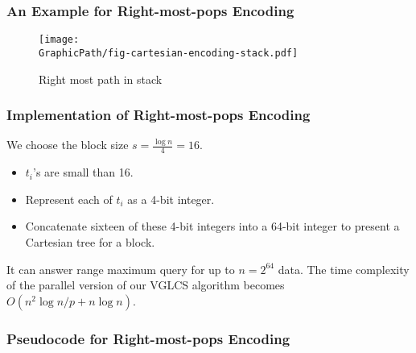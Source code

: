 \begin{frame}
	\frametitle{An Example for Right-most-pops Encoding}
	\begin{figure}[!thb]
	  \centering
	  \texttt{[image: \\GraphicPath/fig-cartesian-encoding-stack.pdf]}
	  \caption{Right most path in stack}
	  \label{fig:interval-cartesian}
	\end{figure}
\end{frame}

\begin{frame}
	\frametitle{Implementation of Right-most-pops Encoding}
	We choose the block size $s = {{\frac{\log n}{4}}} = 16$.

	\begin{itemize}	
		\setlength\itemsep{1em}
		\item
			$t_i$'s are small than 16.
		\item
			Represent each of $t_i$ as a 4-bit integer.
		\item
			Concatenate sixteen of these 4-bit integers into a 64-bit
			integer to present a Cartesian tree for a block.
	\end{itemize}
	\vspace{1cm}
	It can answer range maximum query for up to $n = 2^{64}$ data.  The
	time complexity of the parallel version of our VGLCS algorithm
	becomes $O(n^2 \log{n} / p + n \log n)$.
\end{frame}

\begin{frame}
	\frametitle{Pseudocode for Right-most-pops Encoding}
	\begin{center}
		\scalebox{1} { \begin{minipage}{1\textwidth}
			
			\end{minipage}
		}
	\end{center}
\end{frame}